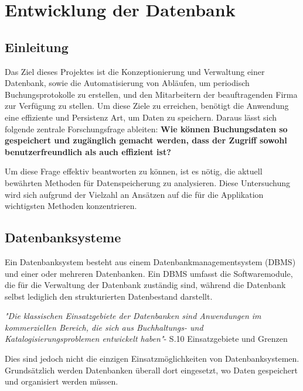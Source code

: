 \section{Entwicklung der Datenbank}

\subsection{Einleitung}

Das Ziel dieses Projektes ist die Konzeptionierung und Verwaltung einer Datenbank, sowie die Automatisierung von Abläufen, um periodisch Buchungsprotokolle zu erstellen, und den Mitarbeitern der beauftragenden Firma zur Verfügung zu stellen.
\newline
Um diese Ziele zu erreichen, benötigt die Anwendung eine effiziente und \gls{Persistenz} Art, um Daten zu speichern.
\newline
Daraus lässt sich folgende zentrale Forschungsfrage ableiten:\vspace{5mm}\newline
\indent \textbf{Wie können Buchungsdaten so gespeichert und zugänglich gemacht werden, dass der \indent Zugriff sowohl benutzerfreundlich als auch effizient ist?}

\vspace{3mm}\noindent Um diese Frage effektiv beantworten zu können, ist es nötig, die aktuell bewährten Methoden für Datenspeicherung zu analysieren. Diese Untersuchung wird sich aufgrund der Vielzahl an Ansätzen auf die für die Applikation wichtigsten Methoden konzentrieren.


\subsection{Datenbanksysteme}
Ein Datenbanksystem besteht aus einem Datenbankmanagementsystem (DBMS) und einer oder mehreren Datenbanken. Ein DBMS umfasst die Softwaremodule, die für die Verwaltung der Datenbank zuständig sind, während die Datenbank selbst lediglich den strukturierten Datenbestand darstellt.

 \vspace{3mm}\noindent \textit{"Die klassischen Einsatzgebiete der Datenbanken sind Anwendungen im kommerziellen Bereich, die sich aus Buchhaltungs- und Katalogisierungsproblemen entwickelt haben"}-\cite{Buch:GunterSaake} S.10 Einsatzgebiete und Grenzen 
 

 \vspace{3mm}\noindent Dies sind jedoch nicht die einzigen Einsatzmöglichkeiten von Datenbanksystemen. Grundsätzlich werden Datenbanken überall dort eingesetzt, wo Daten gespeichert und organisiert werden müssen.
 
